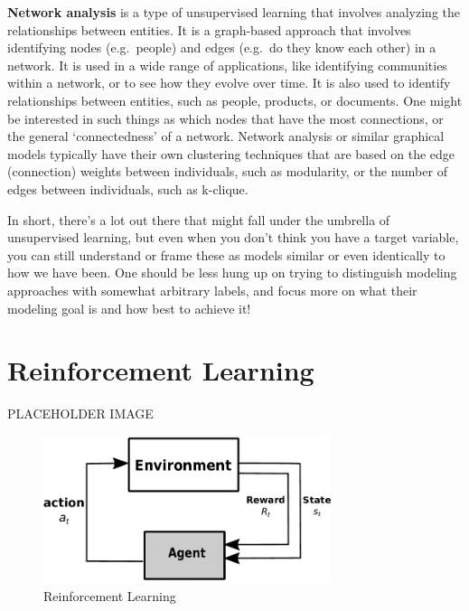 \documentclass[
  letterpaper,
]{krantz}
\begin{document}
\textbf{Network analysis} is a type of unsupervised learning that
involves analyzing the relationships between entities. It is a
graph-based approach that involves identifying nodes (e.g.~people) and
edges (e.g.~do they know each other) in a network. It is used in a wide
range of applications, like identifying communities within a network, or
to see how they evolve over time. It is also used to identify
relationships between entities, such as people, products, or documents.
One might be interested in such things as which nodes that have the most
connections, or the general `connectedness' of a network. Network
analysis or similar graphical models typically have their own clustering
techniques that are based on the edge (connection) weights between
individuals, such as modularity, or the number of edges between
individuals, such as k-clique.

In short, there's a lot out there that might fall under the umbrella of
unsupervised learning, but even when you don't think you have a target
variable, you can still understand or frame these as models similar or
even identically to how we have been. One should be less hung up on
trying to distinguish modeling approaches with somewhat arbitrary
labels, and focus more on what their modeling goal is and how best to
achieve it!

\section{Reinforcement Learning}\label{sec-ml-more-reinforcement}

PLACEHOLDER IMAGE

\begin{figure}

{\centering \includegraphics[width=0.75\textwidth,height=\textheight]{img/rl.png}

}

\caption{Reinforcement Learning}

\end{figure}
\end{document}
